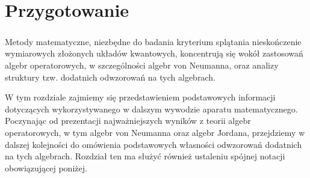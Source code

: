 \chapter{Przygotowanie}
\label{chp:preliminaries}

\paragraph{}
Metody matematyczne,
niezbędne do badania kryterium splątania nieskończenie wymiarowych złożonych
układów kwantowych, koncentrują się wokół zastosowań algebr operatorowych,
w szczególności algebr von Neumanna,
oraz analizy struktury tzw. dodatnich odwzorowań na tych algebrach.

W tym rozdziale zajmiemy się przedstawieniem podstawowych informacji dotyczących
wykorzystywanego w dalszym wywodzie aparatu matematycznego.
Poczynając od prezentacji najważniejszych wyników z teorii algebr operatorowych,
w tym algebr von Neumanna oraz algebr Jordana,
przejdziemy
w dalszej kolejności do omówienia podstawowych własności
odwzorowań dodatnich na tych algebrach.
Rozdział ten ma służyć również ustaleniu spójnej notacji obowiązującej poniżej.


